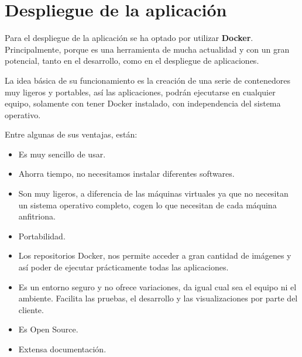 \section{Despliegue de la aplicación}

Para el despliegue de la aplicación se ha optado por utilizar \textbf{Docker}. Principalmente, porque es una herramienta de mucha actualidad y con un gran potencial, tanto en el desarrollo, como en el despliegue de aplicaciones.

La idea básica de su funcionamiento es la creación de una serie de contenedores muy ligeros y portables, así las aplicaciones, podrán ejecutarse en cualquier equipo, solamente con tener Docker instalado, con independencia del sistema operativo.

Entre algunas de sus ventajas, están:

\begin{itemize}
\item Es muy sencillo de usar.
\item Ahorra tiempo, no necesitamos instalar diferentes softwares.
\item Son muy ligeros, a diferencia de las máquinas virtuales ya que no necesitan un sistema operativo completo, cogen lo que necesitan de cada máquina anfitriona.
\item Portabilidad.
\item Los repositorios Docker, nos permite acceder a gran cantidad de imágenes y así poder de ejecutar prácticamente todas las aplicaciones.
\item Es un entorno seguro y no ofrece variaciones, da igual cual sea el equipo ni el ambiente. Facilita las pruebas, el desarrollo y las visualizaciones por parte del cliente.
\item Es Open Source.
\item Extensa documentación.
\end{itemize}
